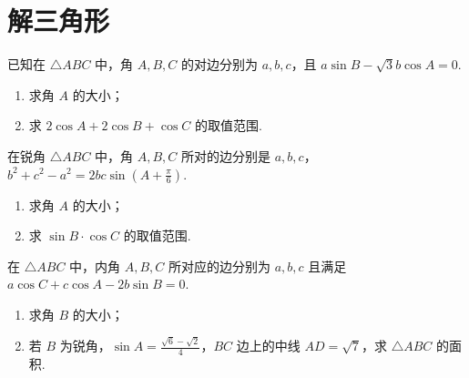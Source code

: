\documentclass[a4paper , final]{ctexart}
\newenvironment{problem}[1]{%
  \item #1
  \par
  \vspace{8cm}
}{}
\begin{document}
\newpage
\section*{解三角形}
\begin{problems}
  \begin{problem}
  {
    已知在 $\triangle ABC$ 中，角 $A, B, C$ 的对边分别为 $a, b, c$，且 $a\sin B - \sqrt{3}b\cos A = 0$.
    \begin{enumerate}[label=(\arabic*)]
      \item 求角 $A$ 的大小；
      \item 求 $2\cos A + 2\cos B + \cos C$ 的取值范围.
    \end{enumerate}
  }
\end{problem}

\begin{problem}
  {
    在锐角 $\triangle ABC$ 中，角 $A, B, C$ 所对的边分别是 $a, b, c$，$b^2 + c^2 - a^2 = 2bc\sin\left(A + \frac{\pi}{6}\right)$.
    \begin{enumerate}[label=(\Roman*)]
      \item 求角 $A$ 的大小；
      \item 求 $\sin B \cdot \cos C$ 的取值范围.
    \end{enumerate}
  }
\end{problem}

\begin{problem}
  {
    在 $\triangle ABC$ 中，内角 $A,B,C$ 所对应的边分别为 $a,b,c$ 且满足 $a\cos C +c\cos A - 2b\sin B = 0$.
    \begin{enumerate}[label=(\arabic*)]
      \item 求角 $B$ 的大小；
      \item 若 $B$ 为锐角，$\sin A = \frac{\sqrt{6}-\sqrt{2}}{4}$，$BC$ 边上的中线 $AD = \sqrt{7}$，求 $\triangle ABC$ 的面积.
    \end{enumerate}
  }
\end{problem}
\end{problems}
\end{document}
